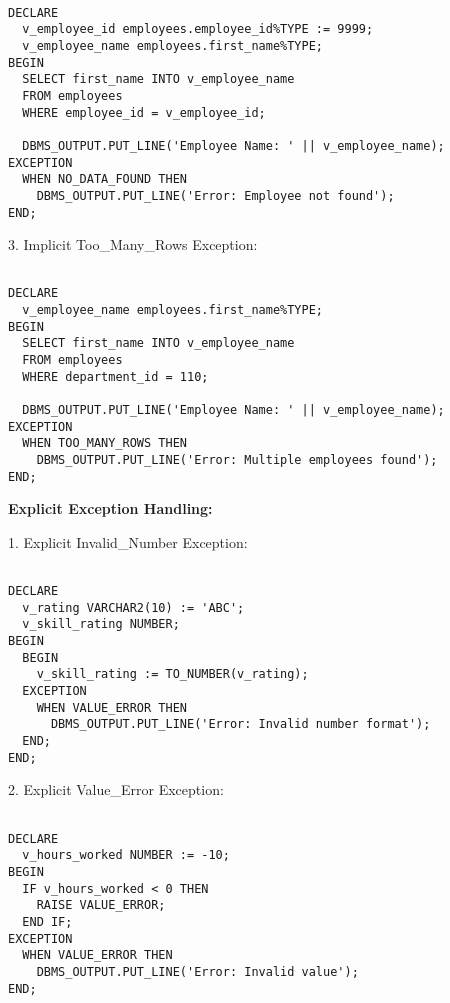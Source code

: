 \documentclass[11pt]{article} %
\begin{document}
\begin{small}
\begin{verbatim}

DECLARE
  v_employee_id employees.employee_id%TYPE := 9999;
  v_employee_name employees.first_name%TYPE;
BEGIN
  SELECT first_name INTO v_employee_name
  FROM employees
  WHERE employee_id = v_employee_id;
  
  DBMS_OUTPUT.PUT_LINE('Employee Name: ' || v_employee_name);
EXCEPTION
  WHEN NO_DATA_FOUND THEN
    DBMS_OUTPUT.PUT_LINE('Error: Employee not found');
END;

\end{verbatim}
\end{small}

3. Implicit Too\_Many\_Rows Exception:

\begin{small}
\begin{verbatim}

DECLARE
  v_employee_name employees.first_name%TYPE;
BEGIN
  SELECT first_name INTO v_employee_name
  FROM employees
  WHERE department_id = 110;
  
  DBMS_OUTPUT.PUT_LINE('Employee Name: ' || v_employee_name);
EXCEPTION
  WHEN TOO_MANY_ROWS THEN
    DBMS_OUTPUT.PUT_LINE('Error: Multiple employees found');
END;

\end{verbatim}
\end{small}

\textbf{Explicit Exception Handling:}

1. Explicit Invalid\_Number Exception:

\begin{small}
\begin{verbatim}

DECLARE
  v_rating VARCHAR2(10) := 'ABC';
  v_skill_rating NUMBER;
BEGIN
  BEGIN
    v_skill_rating := TO_NUMBER(v_rating);
  EXCEPTION
    WHEN VALUE_ERROR THEN
      DBMS_OUTPUT.PUT_LINE('Error: Invalid number format');
  END;
END;

\end{verbatim}
\end{small}

2. Explicit Value\_Error Exception:

\begin{small}
\begin{verbatim}

DECLARE
  v_hours_worked NUMBER := -10;
BEGIN
  IF v_hours_worked < 0 THEN
    RAISE VALUE_ERROR;
  END IF;
EXCEPTION
  WHEN VALUE_ERROR THEN
    DBMS_OUTPUT.PUT_LINE('Error: Invalid value');
END;

\end{verbatim}
\end{small}
\end{document}
